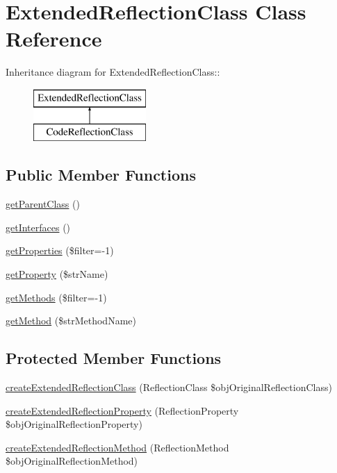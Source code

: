 \hypertarget{class_extended_reflection_class}{
\section{ExtendedReflectionClass Class Reference}
\label{class_extended_reflection_class}
}
Inheritance diagram for ExtendedReflectionClass::\begin{figure}[H]
\begin{center}
\leavevmode
\includegraphics[height=2cm]{class_extended_reflection_class}
\end{center}
\end{figure}
\subsection*{Public Member Functions}
\begin{CompactItemize}
\item 
\hyperlink{class_extended_reflection_class_dbce950becc27c205b461ff9c61aaec2}{getParentClass} ()
\item 
\hyperlink{class_extended_reflection_class_bd1fa7af7876ada7e09c2d4727201b45}{getInterfaces} ()
\item 
\hyperlink{class_extended_reflection_class_8f6bf6f713d03f9ffedf453e65155eab}{getProperties} (\$filter=-1)
\item 
\hyperlink{class_extended_reflection_class_5c58929a1f0a44664ba38d4c05d1cd47}{getProperty} (\$strName)
\item 
\hyperlink{class_extended_reflection_class_01f8e033ec5d82ae20394345fcb06841}{getMethods} (\$filter=-1)
\item 
\hyperlink{class_extended_reflection_class_87cabc3e5bca9750380f3c06cc613d0a}{getMethod} (\$strMethodName)
\end{CompactItemize}
\subsection*{Protected Member Functions}
\begin{CompactItemize}
\item 
\hyperlink{class_extended_reflection_class_851f69035820c89d0ba918a277d2a29f}{createExtendedReflectionClass} (ReflectionClass \$objOriginalReflectionClass)
\item 
\hyperlink{class_extended_reflection_class_6259683f3d0f9583ec36ca51f6e964f9}{createExtendedReflectionProperty} (ReflectionProperty \$objOriginalReflectionProperty)
\item 
\hyperlink{class_extended_reflection_class_922598bd80a21577ccad6d4ca4138474}{createExtendedReflectionMethod} (ReflectionMethod \$objOriginalReflectionMethod)
\end{CompactItemize}


